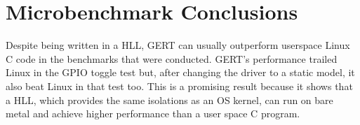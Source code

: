 

\section{Microbenchmark Conclusions}

Despite being written in a HLL, GERT can usually outperform userspace
Linux C code in the benchmarks that were conducted. GERT's performance trailed
Linux in the GPIO toggle test but, after changing the driver to a static model,
it also beat Linux in that test too. This is a promising result because it shows
that a HLL, which provides the same isolations as an OS kernel, can run on bare metal
and achieve higher performance than a user space C program.

